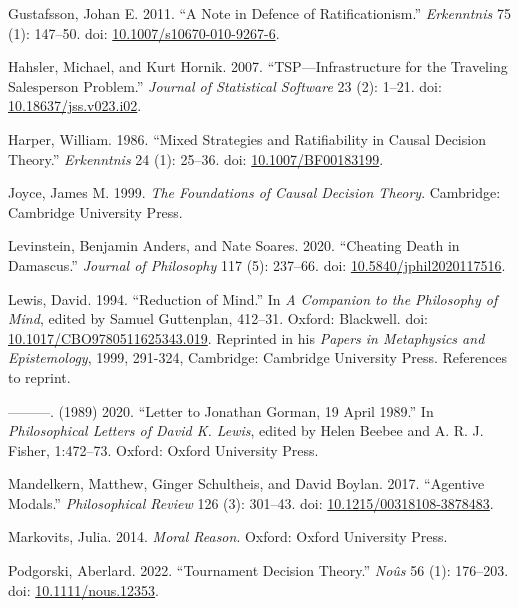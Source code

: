 \documentclass[
  11pt,
  letterpaper,
  DIV=11,
  numbers=noendperiod,
  twoside]{scrartcl}
\newlength{\cslhangindent}
\newenvironment{CSLReferences}[2] %
 {\begin{list}{}{%
  \setlength{\itemindent}{0pt}
  \setlength{\leftmargin}{0pt}
  \setlength{\parsep}{0pt}
  \ifodd #1
   \setlength{\leftmargin}{\cslhangindent}
   \setlength{\itemindent}{-1\cslhangindent}
  \fi
  \setlength{\itemsep}{#2\baselineskip}}}
 {\end{list}}
\begin{document}
\begin{CSLReferences}{1}{0}
Gustafsson, Johan E. 2011. {``A Note in Defence of Ratificationism.''}
\emph{Erkenntnis} 75 (1): 147--50. doi:
\href{https://doi.org/10.1007/s10670-010-9267-6}{10.1007/s10670-010-9267-6}.

Hahsler, Michael, and Kurt Hornik. 2007. {``TSP---Infrastructure for the
Traveling Salesperson Problem.''} \emph{Journal of Statistical Software}
23 (2): 1--21. doi:
\href{https://doi.org/10.18637/jss.v023.i02}{10.18637/jss.v023.i02}.

Harper, William. 1986. {``Mixed Strategies and Ratifiability in Causal
Decision Theory.''} \emph{Erkenntnis} 24 (1): 25--36. doi:
\href{https://doi.org/10.1007/BF00183199}{10.1007/BF00183199}.

Joyce, James M. 1999. \emph{The Foundations of Causal Decision Theory}.
Cambridge: Cambridge University Press.

Levinstein, Benjamin Anders, and Nate Soares. 2020. {``Cheating Death in
Damascus.''} \emph{Journal of Philosophy} 117 (5): 237--66. doi:
\href{https://doi.org/10.5840/jphil2020117516}{10.5840/jphil2020117516}.

Lewis, David. 1994. {``Reduction of Mind.''} In \emph{A Companion to the
Philosophy of Mind}, edited by Samuel Guttenplan, 412--31. Oxford:
Blackwell. doi:
\href{https://doi.org/10.1017/CBO9780511625343.019}{10.1017/CBO9780511625343.019}.
Reprinted in his \emph{Papers in Metaphysics and Epistemology}, 1999,
291-324, Cambridge: Cambridge University Press. References to reprint.

---------. (1989) 2020. {``Letter to Jonathan Gorman, 19 April 1989.''}
In \emph{Philosophical Letters of David {K}. Lewis}, edited by Helen
Beebee and A. R. J. Fisher, 1:472--73. Oxford: Oxford University Press.

Mandelkern, Matthew, Ginger Schultheis, and David Boylan. 2017.
{``Agentive Modals.''} \emph{Philosophical Review} 126 (3): 301--43.
doi:
\href{https://doi.org/10.1215/00318108-3878483}{10.1215/00318108-3878483}.

Markovits, Julia. 2014. \emph{Moral Reason}. Oxford: Oxford University
Press.

Podgorski, Aberlard. 2022. {``Tournament Decision Theory.''}
\emph{No{û}s} 56 (1): 176--203. doi:
\href{https://doi.org/10.1111/nous.12353}{10.1111/nous.12353}.


\end{CSLReferences}
\end{document}
